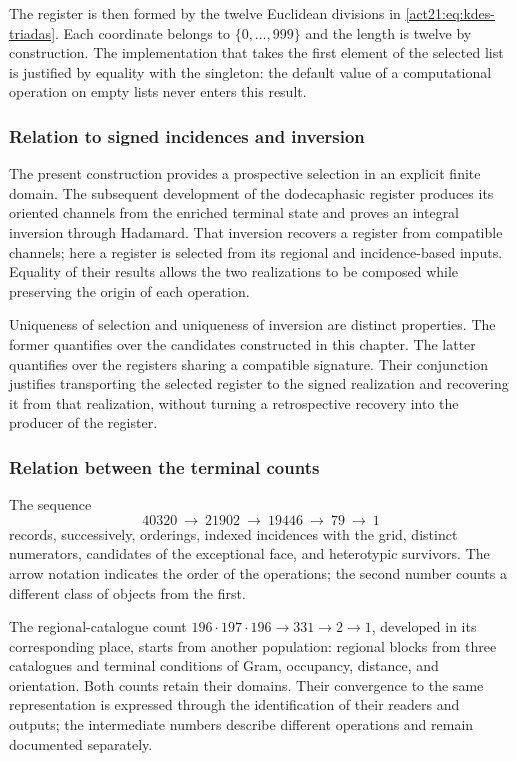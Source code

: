 The register is then formed by the twelve Euclidean divisions in
\eqref{act21:eq:kdes-triadas}. Each coordinate belongs to
$\{0,\ldots,999\}$ and the length is twelve by construction. The
implementation that takes the first element of the selected list
is justified by equality with the singleton: the default value
of a computational operation on empty lists never enters
this result.

\subsubsection{Relation to signed incidences and inversion}

The present construction provides a prospective selection in an
explicit finite domain. The subsequent development of the dodecaphasic
register produces its oriented channels from the enriched terminal
state and proves an integral inversion through
Hadamard. That inversion recovers a register from compatible
channels; here a register is selected from its
regional and incidence-based inputs. Equality of their results
allows the two realizations to be composed while preserving the origin of each
operation.

Uniqueness of selection and uniqueness of inversion are distinct
properties. The former quantifies over the candidates constructed in this
chapter. The latter quantifies over the registers sharing a compatible
signature. Their conjunction justifies transporting the selected register
to the signed realization and recovering it from that realization, without
turning a retrospective recovery into the producer of the register.

\subsubsection{Relation between the terminal counts}

The sequence
\[
 40320\ \longrightarrow\ 21902\ \longrightarrow\ 19446
 \ \longrightarrow\ 79\ \longrightarrow\ 1
\]
records, successively, orderings, indexed incidences with the
grid, distinct numerators, candidates of the exceptional face, and
heterotypic survivors. The arrow notation indicates the order of
the operations; the second number counts a different class of objects
from the first.

The regional-catalogue count
$196\cdot197\cdot196\longrightarrow331\longrightarrow2
\longrightarrow1$, developed in its corresponding place, starts from
another population: regional blocks from three catalogues and terminal
conditions of Gram, occupancy, distance, and orientation. Both counts
retain their domains. Their convergence to the same representation is
expressed through the identification of their readers and outputs;
the intermediate numbers describe different operations and remain
documented separately.

